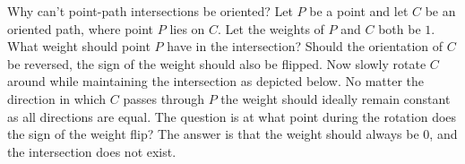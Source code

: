 \documentclass{book}
\begin{document}
%
%
%
%
%

Why can't point-path intersections be oriented? Let \(P\) be a point and let \(C\) be an oriented path, where point \(P\) lies on \(C\). Let the weights of \(P\) and \(C\) both be \(1\). What weight should point \(P\) have in the intersection? Should the orientation of \(C\) be reversed, the sign of the weight should also be flipped. Now slowly rotate \(C\) around while maintaining the intersection as depicted below. No matter the direction in which \(C\) passes through \(P\) the weight should ideally remain constant as all directions are equal. The question is at what point during the rotation does the sign of the weight flip? The answer is that the weight should always be \(0\), and the intersection does not exist.  
\end{document}
